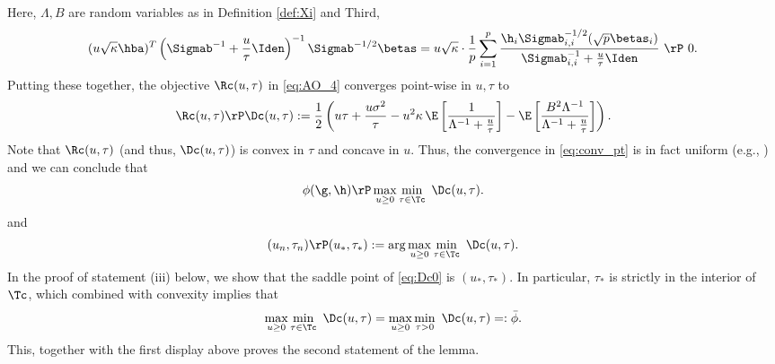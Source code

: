 Here, $\Lambda,B$ are random variables as in Definition \ref{def:Xi} and 
Third, 
\begin{align}
(u\sqrt{\kappa}\hba)^T\left(\Sigmab^{-1}+\frac{u}{\tau}\Iden\right)^{-1}\Sigmab^{-1/2}\betas = u\sqrt{\kappa} \cdot \frac{1}{p}\sum_{i=1}
^p \frac{\h_i\Sigmab_{i,i}^{-1/2}(\sqrt{p}\betas_i)}{\Sigmab_{i,i}^{-1}+\frac{u}{\tau}\Iden} ~\rP~ 0.
\end{align}
Putting these together, the objective $\Rc(u,\tau)$ in \eqref{eq:AO_4} converges point-wise in $u,\tau$ to
\begin{align}
\Rc(u,\tau)\rP\Dc(u,\tau) := \frac{1}{2}\left({u\tau} + \frac{u\sigma^2}{\tau} - u^2\kappa\,\E\left[ \frac{1}{\Lambda^{-1}+\frac{u}{\tau}} \right] - \E\left[\frac{B^2\Lambda^{-1}}{\Lambda^{-1}+\frac{u}{\tau}}\right] \right).\label{eq:conv_pt}
\end{align}
Note that $\Rc(u,\tau)$ (and thus, $\Dc(u,\tau)$) is convex in $\tau$ and concave in $u$. Thus, the convergence in \eqref{eq:conv_pt} is in fact uniform (e.g., \cite{AG1982}) and we can conclude that 
\begin{align}\label{eq:Dc0}
\phi(\g,\h) \rP \max_{u\geq 0}\min_{\tau\in\Tc}~ \Dc(u,\tau).
\end{align}
and
\begin{align}\label{eq:Dc}
(u_n,\tau_n) \rP (u_*,\tau_*):=\arg\max_{u\geq 0}\min_{\tau\in\Tc}~ \Dc(u,\tau).
\end{align}
In the proof of statement (iii) below, we show that the saddle point of \eqref{eq:Dc0} is $(u_*,\tau_*)$. In particular, $\tau_*$ is strictly in the interior of $\Tc$, which combined with convexity implies that
$$
 \max_{u\geq 0}\min_{\tau\in\Tc}~ \Dc(u,\tau) =  \max_{u\geq 0}\min_{\tau>0}~ \Dc(u,\tau) =: \bar\phi.
$$
This, together with the first display above proves the second statement of the lemma.

